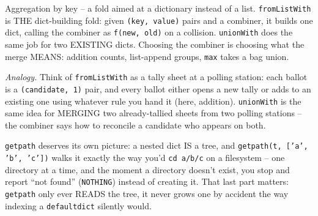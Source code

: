 \documentclass[10pt,letterpaper]{book}
\begin{document}
Aggregation by key -- a fold aimed at a dictionary instead of a list. \texttt{fromListWith} is THE
dict-building fold: given \texttt{(key, value)} pairs and a combiner, it builds one dict, calling the
combiner as \texttt{f(new, old)} on a collision. \texttt{unionWith} does the same job for two EXISTING
dicts. Choosing the combiner is choosing what the merge MEANS: addition counts, list-append groups,
\texttt{max} takes a bag union.

\textit{Analogy.} Think of \texttt{fromListWith} as a tally sheet at a polling station: each ballot
is a \texttt{(candidate, 1)} pair, and every ballot either opens a new tally or adds to an existing
one using whatever rule you hand it (here, addition). \texttt{unionWith} is the same idea for
MERGING two already-tallied sheets from two polling stations -- the combiner says how to reconcile a
candidate who appears on both.

\texttt{getpath} deserves its own picture: a nested dict IS a tree, and \texttt{getpath(t, ['a',
'b', 'c'])} walks it exactly the way you'd \texttt{cd a/b/c} on a filesystem -- one directory at a
time, and the moment a directory doesn't exist, you stop and report ``not found'' (\texttt{NOTHING})
instead of creating it. That last part matters: \texttt{getpath} only ever READS the tree, it never
grows one by accident the way indexing a \texttt{defaultdict} silently would.
\end{document}
